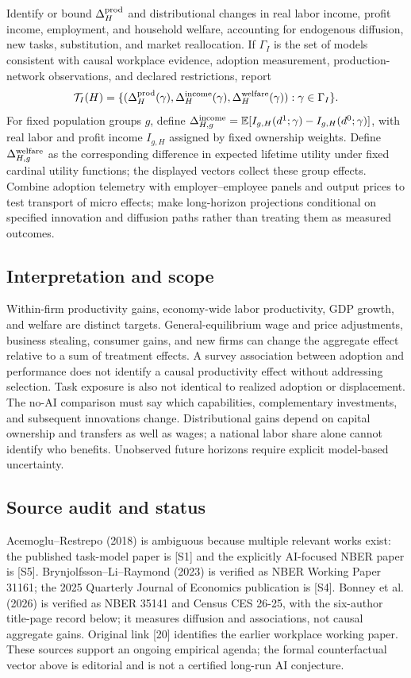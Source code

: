 \documentclass[11pt,a4paper]{article}
\begin{document}
Identify or bound $\Delta_H^{\rm prod}$ and distributional changes in real labor income, profit income, employment, and household welfare, accounting for endogenous diffusion, new tasks, substitution, and market reallocation. If $\Gamma_I$ is the set of models consistent with causal workplace evidence, adoption measurement, production-network observations, and declared restrictions, report
\[
\mathcal T_I(H)=\{(\Delta_H^{\rm prod}(\gamma),\Delta_H^{\rm income}(\gamma),
 \Delta_H^{\rm welfare}(\gamma)):\gamma\in\Gamma_I\}.
\]
For fixed population groups $g$, define $\Delta_{H,g}^{\rm income}=\mathbb E[I_{g,H}(d^1;\gamma)-I_{g,H}(d^0;\gamma)]$, with real labor and profit income $I_{g,H}$ assigned by fixed ownership weights. Define $\Delta_{H,g}^{\rm welfare}$ as the corresponding difference in expected lifetime utility under fixed cardinal utility functions; the displayed vectors collect these group effects. Combine adoption telemetry with employer--employee panels and output prices to test transport of micro effects; make long-horizon projections conditional on specified innovation and diffusion paths rather than treating them as measured outcomes.

\subsection*{Interpretation and scope}

Within-firm productivity gains, economy-wide labor productivity, GDP growth, and welfare are distinct targets. General-equilibrium wage and price adjustments, business stealing, consumer gains, and new firms can change the aggregate effect relative to a sum of treatment effects. A survey association between adoption and performance does not identify a causal productivity effect without addressing selection. Task exposure is also not identical to realized adoption or displacement. The no-AI comparison must say which capabilities, complementary investments, and subsequent innovations change. Distributional gains depend on capital ownership and transfers as well as wages; a national labor share alone cannot identify who benefits. Unobserved future horizons require explicit model-based uncertainty.

\subsection*{Source audit and status}

Acemoglu--Restrepo (2018) is ambiguous because multiple relevant works exist: the published task-model paper is [S1] and the explicitly AI-focused NBER paper is [S5]. Brynjolfsson--Li--Raymond (2023) is verified as NBER Working Paper 31161; the 2025 Quarterly Journal of Economics publication is [S4]. Bonney et al. (2026) is verified as NBER 35141 and Census CES 26-25, with the six-author title-page record below; it measures diffusion and associations, not causal aggregate gains. Original link [20] identifies the earlier workplace working paper. These sources support an ongoing empirical agenda; the formal counterfactual vector above is editorial and is not a certified long-run AI conjecture.
\end{document}

